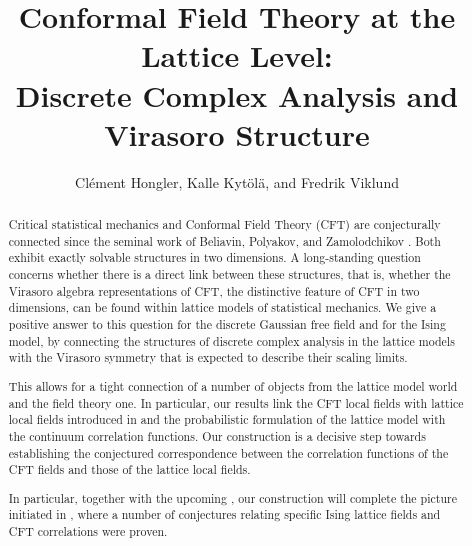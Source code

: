 \documentclass[12pt,oneside,english]{amsart}
\numberwithin{equation}{section}
\numberwithin{figure}{section}
\theoremstyle{plain}
\theoremstyle{plain}
\theoremstyle{plain}
\theoremstyle{plain}
\theoremstyle{remark}
\theoremstyle{definition}
\theoremstyle{plain}
\theoremstyle{plain}
\numberwithin{thm}{section}
\begin{document}
\title[Discrete Complex Analysis and Virasoro Structure]%
{Conformal Field Theory at the Lattice Level: \\
 Discrete Complex Analysis and Virasoro Structure}

\author[Hongler \& Kyt\"ol\"a \& Viklund]%
{Cl\'ement Hongler, Kalle Kyt\"ol\"a, and Fredrik Viklund}

\address{Chair of Statistical Field Theory, Institute of Mathematics, EPFL
Station 8 CH-1015 Lausanne Switzerland }


\address{Department of Mathematics and Systems Analysis, Aalto University,
P.O. Box 11100, FI-00076 Aalto, Finland}


\address{Department of Mathematics, KTH Royal Institute of Technology, 100
44 Stockholm, Sweden}






\begin{abstract}
Critical statistical mechanics and Conformal Field Theory (CFT) are
conjecturally connected since the seminal work of Beliavin, Polyakov,
and Zamolodchikov \cite{belavin-polyakov-zamolodchikov-i}. Both exhibit
exactly solvable structures in two dimensions. A long-standing question
\cite{itoyama-thacker} concerns whether there is a direct link between
these structures, that is, whether the Virasoro algebra representations
of CFT, the distinctive feature of CFT in two dimensions, 
can be found within lattice models of statistical mechanics.
We give a positive answer to this question for
the discrete Gaussian free field and for the Ising model, by connecting
the structures of discrete complex analysis in the lattice models with
the Virasoro symmetry that is expected to describe their scaling limits.

This allows for a tight connection of a number of objects from the
lattice model world and the field theory one. In particular, our results
link the CFT local fields with lattice local fields introduced in
\cite{gheissari-hongler-park} and the probabilistic formulation of
the lattice model with the continuum correlation functions. Our construction
is a decisive step towards establishing the conjectured correspondence
between the correlation functions of the CFT fields and those of the
lattice local fields.

In particular, together with the upcoming \cite{chelkak-hongler-izyurov-ii},
our construction will complete the picture initiated in 
\cite{hongler-smirnov,hongler-ii,chelkak-hongler-izyurov},
where a number of conjectures relating specific Ising lattice fields
and CFT correlations were proven. 

\end{abstract}
\end{document}

